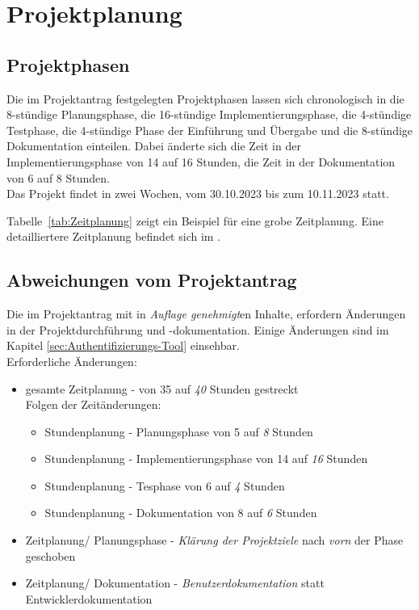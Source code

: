 \section{Projektplanung} 
\label{sec:Projektplanung}

\subsection{Projektphasen}
\label{sec:Projektphasen}
Die im Projektantrag festgelegten Projektphasen lassen sich chronologisch in die 8-stündige Planungsphase, 
die 16-stündige Implementierungsphase, die 4-stündige Testphase, die 4-stündige Phase der Einführung und Übergabe 
und die 8-stündige Dokumentation einteilen.
Dabei änderte sich die Zeit in der Implementierungsphase von 14 auf 16 Stunden, die Zeit in der 
Dokumentation von 6 auf 8 Stunden.
\\Das Projekt findet in zwei Wochen, vom 30.10.2023 bis zum 10.11.2023 statt.

Tabelle~\ref{tab:Zeitplanung}  zeigt ein Beispiel für eine grobe Zeitplanung. 
Eine detailliertere Zeitplanung befindet sich im  .


\subsection{Abweichungen vom Projektantrag}
\label{sec:AbweichungenProjektantrag}
Die im Projektantrag mit in \textit{Auflage genehmigt}en Inhalte, erfordern Änderungen in der 
Projektdurchführung und -dokumentation. Einige Änderungen sind im Kapitel 
\ref{sec:Authentifizierungs-Tool}  einsehbar. 
\\Erforderliche Änderungen:
\begin{itemize} [label=--]
	\item gesamte Zeitplanung - von 35 auf \textit{40} Stunden gestreckt
	\\Folgen der Zeitänderungen:
	\begin{itemize}
		\item Stundenplanung - Planungsphase von 5 auf \textit{8} Stunden
		\item Stundenplanung - Implementierungsphase von 14 auf \textit{16} Stunden
		\item Stundenplanung - Tesphase von 6 auf \textit{4} Stunden
		\item Stundenplanung - Dokumentation von 8 auf \textit{6} Stunden 
	\end{itemize}
	\item Zeitplanung/ Planungsphase - \textit{Klärung der Projektziele} nach \textit{vorn} der Phase geschoben
	\item Zeitplanung/ Dokumentation - \textit{Benutzerdokumentation} statt Entwicklerdokumentation
\end{itemize}

